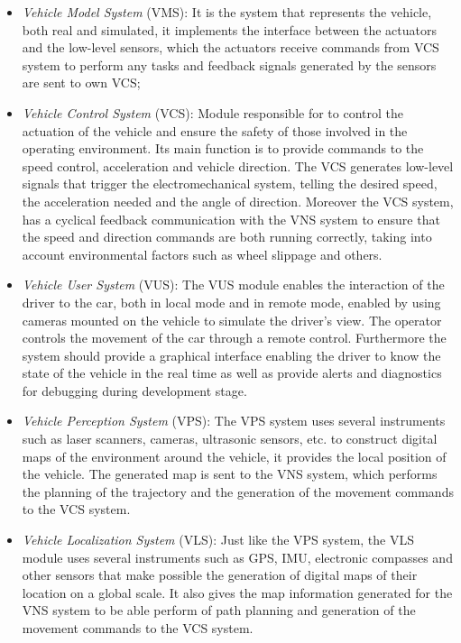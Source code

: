 \documentclass[conference]{IEEEtran}
\begin{document}
\begin{itemize}
	\item \textit{Vehicle Model System} (VMS): It is the system that represents the vehicle, both real and simulated, it implements the interface between the actuators and the low-level sensors, which the actuators receive commands from VCS system to perform any tasks and feedback signals generated by the sensors are sent to own VCS;
	
	\item \textit{Vehicle Control System} (VCS): Module responsible for to control the actuation of the vehicle and ensure the safety of those involved in the operating environment. Its main function is to provide commands to the speed control, acceleration and vehicle direction. The VCS generates low-level signals that trigger the electromechanical system, telling the desired speed, the acceleration needed and the angle of direction. Moreover the VCS system, has a cyclical feedback communication with the VNS system to ensure that the speed and direction commands are both running correctly, taking into account environmental factors such as wheel slippage and others.
	
	\item \textit{Vehicle User System} (VUS): The VUS module enables the interaction of the driver to the car, both in local mode and in remote mode, enabled by using cameras mounted on the vehicle to simulate the driver's view. The operator controls the movement of the car through a remote control. Furthermore the system should provide a graphical interface enabling the driver to know the state of the vehicle in the real time as well as provide alerts and diagnostics for debugging during development stage.
	
	\item \textit{Vehicle Perception System} (VPS): The VPS system uses several instruments such as laser scanners, cameras, ultrasonic sensors, etc. to construct digital maps of the environment around the vehicle, it provides the local position of the vehicle. The generated map is sent to the VNS system, which performs the planning of the trajectory and the generation of the movement commands to the VCS system.

	\item \textit{Vehicle Localization System} (VLS): Just like the VPS system, the VLS module uses several instruments such as GPS, IMU, electronic compasses and other sensors that make possible the generation of digital maps of their location on a global scale. It also gives the map information generated for the VNS system to be able perform of path planning and generation of the movement commands to the VCS system.
		

\end{itemize}
\end{document}
